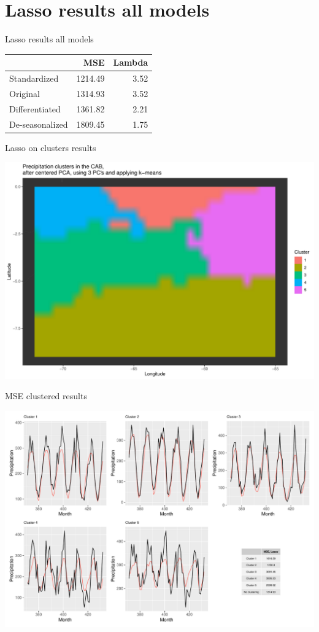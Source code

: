 \documentclass[
  ignorenonframetext,
]{beamer}
\begin{document}
\hypertarget{lasso-results-all-models}{%
\section{Lasso results all models}\label{lasso-results-all-models}}

\begin{frame}{Lasso results all models}
\begin{longtable}[]{@{}lrr@{}}
\toprule()
& MSE & Lambda \\
\midrule()
\endhead
Standardized & 1214.49 & 3.52 \\
Original & 1314.93 & 3.52 \\
Differentiated & 1361.82 & 2.21 \\
De-seasonalized & 1809.45 & 1.75 \\
\bottomrule()
\end{longtable}
\end{frame}

\begin{frame}{Lasso on clusters results}
\protect\hypertarget{lasso-on-clusters-results}{}
\begin{center}\includegraphics[width=0.5\linewidth]{ma-presentation_files/figure-beamer/cluster-map2-1} \end{center}
\end{frame}

\begin{frame}{MSE clustered results}
\protect\hypertarget{mse-clustered-results}{}
\begin{center}\includegraphics[width=0.75\linewidth]{ma-presentation_files/figure-beamer/unnamed-chunk-20-1} \end{center}
\end{frame}
\end{document}
